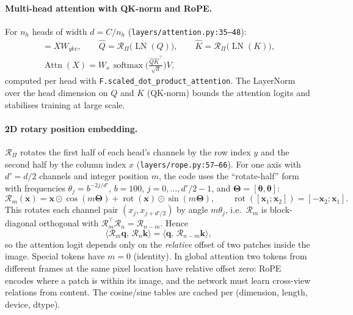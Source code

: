 \documentclass[11pt,a4paper]{article}
\newcommand{\src}[1]{\texttt{\small #1}}
\begin{document}
\paragraph{Multi-head attention with QK-norm and RoPE.} For $n_h$ heads of width $d=C/n_h$ (\src{layers/attention.py:35--48}):
\begin{gather*}
  [Q,K,V] = X W_{qkv},\qquad \hat{Q} = \mathcal{R}_{\Pi}\big(\operatorname{LN}(Q)\big),\qquad
  \hat{K} = \mathcal{R}_{\Pi}\big(\operatorname{LN}(K)\big),\\
  \operatorname{Attn}(X) = W_o\,\operatorname{softmax}\!\Big(\frac{\hat{Q}\hat{K}^\top}{\sqrt{d}}\Big)V ,
\end{gather*}
computed per head with \texttt{F.scaled\_dot\_product\_attention}. The LayerNorm over the head dimension on $Q$ and $K$
(QK-norm) bounds the attention logits and stabilises training at large scale.

\paragraph{2D rotary position embedding.} $\mathcal{R}_\Pi$ rotates the first half of each head's channels by the row index
$y$ and the second half by the column index $x$ (\src{layers/rope.py:57--66}). For one axis with $d' = d/2$ channels and integer
position $m$, the code uses the ``rotate-half'' form with frequencies $\theta_j = b^{-2j/d'}$, $b = 100$,
$j = 0,\dots,d'/2-1$, and $\bm\Theta = [\bm\theta, \bm\theta]$:
\[
  \mathcal{R}_m(\mathbf{x}) = \mathbf{x}\odot\cos(m\bm\Theta) + \operatorname{rot}(\mathbf{x})\odot\sin(m\bm\Theta),
  \qquad \operatorname{rot}([\mathbf{x}_1;\mathbf{x}_2]) = [-\mathbf{x}_2;\mathbf{x}_1].
\]
This rotates each channel pair $(x_j, x_{j+d'/2})$ by angle $m\theta_j$, i.e.\ $\mathcal{R}_m$ is block-diagonal
orthogonal with $\mathcal{R}_m^\top\mathcal{R}_n = \mathcal{R}_{n-m}$. Hence
\[
  \big\langle \mathcal{R}_m\mathbf{q},\, \mathcal{R}_n\mathbf{k}\big\rangle = \big\langle \mathbf{q},\, \mathcal{R}_{n-m}\mathbf{k}\big\rangle ,
\]
so the attention logit depends only on the \emph{relative} offset of two patches inside the image. Special tokens have
$m=0$ (identity). In global attention two tokens from different frames at the same pixel location have relative offset zero:
RoPE encodes where a patch is within its image, and the network must learn cross-view relations from content. The cosine/sine
tables are cached per (dimension, length, device, dtype).

\end{document}
